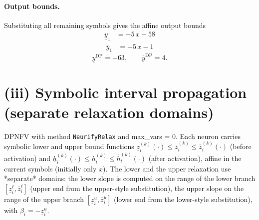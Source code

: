\documentclass[11pt]{article}
\begin{document}
\paragraph{Output bounds.}
Substituting all remaining symbols gives the affine output bounds
\begin{align*}
\underline{y}_{1} &= -5\,x - 58
\end{align*}
\begin{align*}
\overline{y}_{1} &= -5\,x - 1
\end{align*}
\begin{equation*}
\underline{y}^{\text{DP}} = -63, \qquad \overline{y}^{\text{DP}} = 4.
\end{equation*}

\section{(iii) Symbolic interval propagation (separate relaxation domains)}
DPNFV with method \texttt{NeurifyRelax} and max\_vars = 0. Each neuron carries symbolic lower and upper bound functions
$\underline{z}^{(k)}_i(\cdot) \le z^{(k)}_i \le \overline{z}^{(k)}_i(\cdot)$ (before activation)
and $\underline{h}^{(k)}_i(\cdot) \le h^{(k)}_i \le \overline{h}^{(k)}_i(\cdot)$ (after activation),
affine in the current symbols (initially only $x$).
The lower and the upper relaxation use *separate* domains:
the lower slope is computed on the range of the lower branch
$[\underline{z}^{\ell}_i, \overline{z}^{\ell}_i]$ (upper end from the upper-style substitution),
the upper slope on the range of the upper branch
$[\underline{z}^{u}_i, \overline{z}^{u}_i]$ (lower end from the lower-style substitution),
with $\beta_i = -\underline{z}^{u}_i$.
\end{document}
